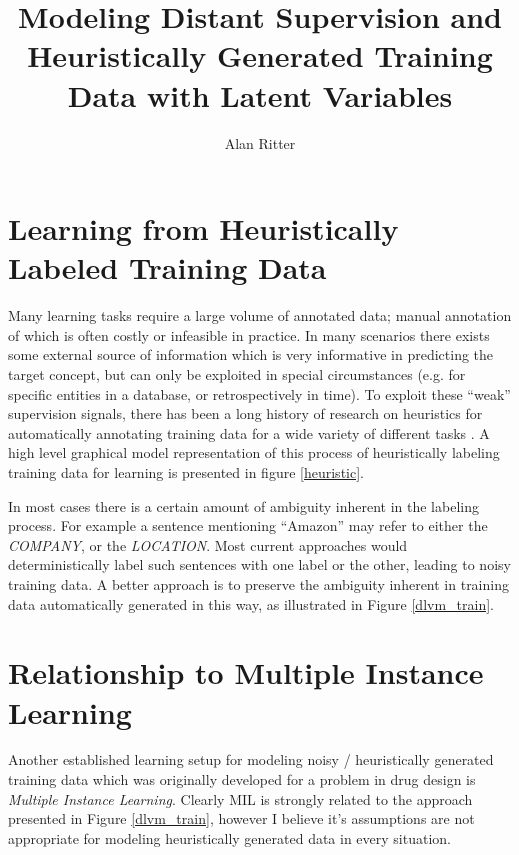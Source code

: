 \documentclass[12pt]{article}
\begin{document}
\date{}
\title{Modeling Distant Supervision and Heuristically Generated Training Data with Latent Variables}
\author{Alan Ritter}
\maketitle



\section{Learning from Heuristically Labeled Training Data}
Many learning tasks require a large volume of annotated data; manual annotation of which is often costly or infeasible in practice.
In many scenarios there exists some external source of information which is very informative in predicting the target concept, but
can only be exploited in special circumstances (e.g. for specific entities in a database, or retrospectively in time).
To exploit these ``weak'' supervision signals, there has been a long history of research on heuristics for automatically annotating training data
for a wide variety of different tasks \citep{Agichtein01,Carlson10,Weld09,mintz09}.
A high level graphical model representation of this process of heuristically labeling training data for learning is presented in figure \ref{heuristic}.

In most cases there is a certain amount of ambiguity inherent in the labeling process.  For example a sentence mentioning ``Amazon''
may refer to either the {\sl COMPANY}, or the {\sl LOCATION}.  Most current approaches would deterministically label such
sentences with one label or the other, leading to noisy training data.
A better approach is to preserve the ambiguity inherent in training data automatically generated in this way, as illustrated
in Figure \ref{dlvm_train}.

\section{Relationship to Multiple Instance Learning}
Another established learning setup for modeling noisy / heuristically generated training data which was originally developed for 
a problem in drug design is \emph{Multiple Instance Learning}.  Clearly MIL is strongly related to the approach presented in Figure
\ref{dlvm_train}, however I believe it's assumptions are
not appropriate for modeling heuristically generated data in every situation.
\end{document}
